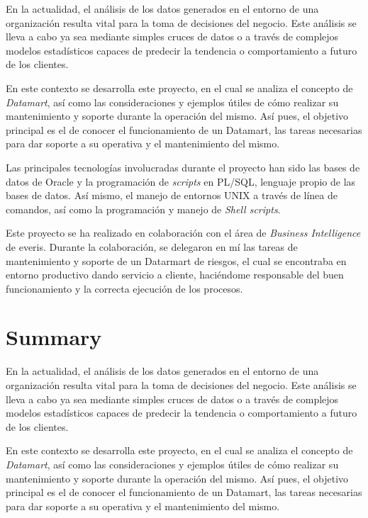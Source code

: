 \documentclass[a4paper, 12pt]{book}
\begin{document}
En la actualidad, el análisis de los datos generados en el entorno de una organización resulta vital para la toma de decisiones del negocio. Este análisis se lleva a cabo ya sea mediante simples cruces de datos o a través de complejos modelos estadísticos capaces de predecir la tendencia o comportamiento a futuro de los clientes.

En este contexto se desarrolla este proyecto, en el cual se analiza el concepto de \textit{Datamart}, así como las consideraciones y ejemplos útiles de cómo realizar su mantenimiento y soporte durante la operación del mismo. Así pues, el objetivo principal es el de conocer el funcionamiento de un Datamart, las tareas necesarias para dar soporte a su operativa y el mantenimiento del mismo.

Las principales tecnologías involucradas durante el proyecto han sido las bases de datos de Oracle y la programación de \textit{scripts} en PL/SQL, lenguaje propio de las bases de datos. Así mismo, el manejo de entornos UNIX a través de línea de comandos, así como la programación y manejo de \textit{Shell scripts}.

Este proyecto se ha realizado en colaboración con el área de \textit{Business Intelligence} de everis. Durante la colaboración, se delegaron en mí las tareas de mantenimiento y soporte de un Datarmart de riesgos, el cual se encontraba en entorno productivo dando servicio a cliente, haciéndome responsable del buen funcionamiento y la correcta ejecución de los procesos.


\chapter*{Summary}

En la actualidad, el análisis de los datos generados en el entorno de una organización resulta vital para la toma de decisiones del negocio. Este análisis se lleva a cabo ya sea mediante simples cruces de datos o a través de complejos modelos estadísticos capaces de predecir la tendencia o comportamiento a futuro de los clientes.

En este contexto se desarrolla este proyecto, en el cual se analiza el concepto de \textit{Datamart}, así como las consideraciones y ejemplos útiles de cómo realizar su mantenimiento y soporte durante la operación del mismo. Así pues, el objetivo principal es el de conocer el funcionamiento de un Datamart, las tareas necesarias para dar soporte a su operativa y el mantenimiento del mismo.
\end{document}
